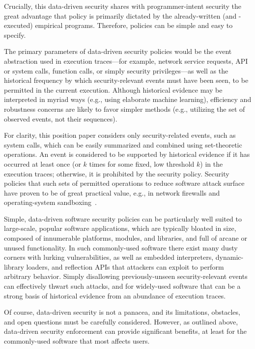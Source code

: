 \documentclass{IEEEtran}
\begin{document}
Crucially, this data-driven security shares with programmer-intent security
the great advantage 
that policy is primarily dictated by the already-written (and -executed) empirical programs.
Therefore,
policies can be simple and easy to specify.


The primary parameters of data-driven security policies would be the event
abstraction used in execution traces---for example,
network service requests, API or system calls, function calls, or simply security privileges---as
well as
the historical frequency by which 
security-relevant events must have been seen,
to be permitted in the current execution.
Although historical evidence may be interpreted in myriad ways
(e.g., using elaborate machine learning),
efficiency and robustness concerns are likely to favor simpler methods
(e.g., utilizing the set of observed events, not their sequences).


For clarity,
this position paper considers
only security-related events, such as system calls,
which can be easily summarized and combined using set-theoretic operations.
An event is considered to be supported by 
historical evidence
if it has occurred at least once (or $k$ times for some fixed, low threshold $k$)
in the execution traces;
otherwise, it is prohibited by the security policy.
Security policies
that such sets of permitted operations to reduce software attack surface 
have proven to be of great practical value,
e.g., in network firewalls and operating-system sandboxing~\cite{ChromeSandbox}.


Simple, data-driven software security policies
can be particularly well suited
to large-scale, popular software applications,
which are typically
bloated in size,
composed of innumerable platforms, modules, and libraries,
and full of arcane or unused functionality.
In such commonly-used software
there exist many dusty corners with lurking vulnerabilities,
as well as embedded interpreters, dynamic-library loaders, and reflection APIs
that attackers can exploit to perform arbitrary behavior.
Simply disallowing previously-unseen security-relevant events
can effectively thwart such attacks,
and for widely-used software
that can be a strong basis of historical evidence 
from an abundance of execution traces.




Of course, data-driven security is not a panacea, 
and its limitations, obstacles, and open questions must be carefully considered.
However, 
as outlined above,
data-driven security enforcement can provide significant benefits,
at least for the commonly-used software that most affects users.
\end{document}
